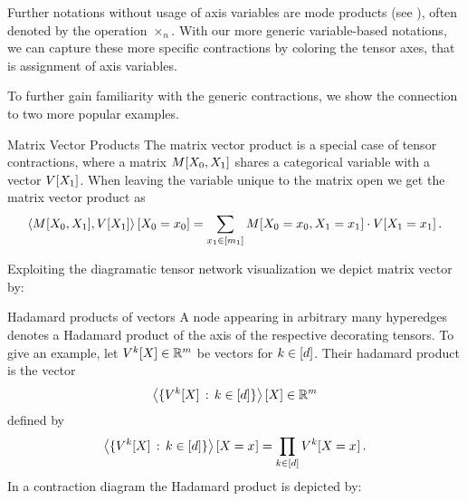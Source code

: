 Further notations without usage of axis variables are mode products (see \cite{kolda_tensor_2009,hackbusch_tensor_2012,cichocki_tensor_2015}), often denoted by the operation $\times_n$.
With our more generic variable-based notations, we can capture these more specific contractions by coloring the tensor axes, that is assignment of axis variables.

To further gain familiarity with the generic contractions, we show the connection to two more popular examples.

\begin{example}{Matrix Vector Products}\label{exa:matrixProduct}
	The matrix vector product is a special case of tensor contractions, where a matrix $M[X_{0},X_{1}]$ shares a categorical variable with a vector $V[X_{1}]$.
	When leaving the variable unique to the matrix open we get the matrix vector product as
		\[ \left\langle M[X_{0},X_{1}],V[X_{1}]\right\rangle \left[ X_{0}=x_{0} \right] = \sum_{x_{1}\in[m_{1}]} M[X_{0}=x_{0},X_{1}=x_{1}] \cdot V[X_{1}=x_{1}] \, .  \]

	Exploiting the diagramatic tensor network visualization we depict matrix vector by: %
	\begin{center}
		
	\end{center}
\end{example}

\begin{example}{Hadamard products of vectors}\label{exa:hadamard}
	A node appearing in arbitrary many hyperedges denotes a Hadamard product of the axis of the respective decorating tensors.
	To give an example, let $V^{k}[X]\in\mathbb{R}^m$ be vectors for $k\in[d]$. Their hadamard product is the vector
		\[ \left\langle \{V^{k}[X] \, : \, k\in[d]\}\right\rangle \left[ X \right]  \in \mathbb{R}^m \]
	defined by
		\[ \left\langle \{V^{k}[X] \, : \, k\in[d]\}\right\rangle \left[ X_{}=x_{} \right]
		= \prod_{k\in[d]} V^{k}[X_{}=x_{}]\, . \]
	In a contraction diagram the Hadamard product is depicted by: %
	\begin{center}
		
	\end{center}
\end{example}



